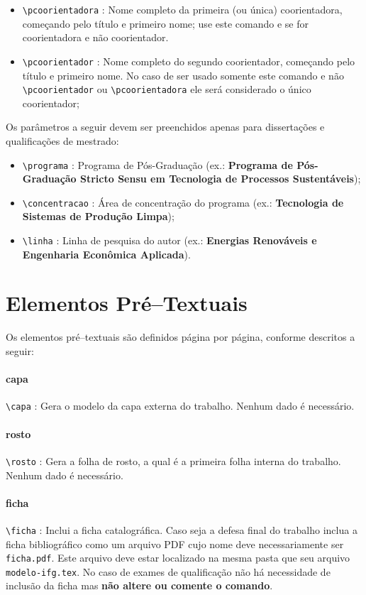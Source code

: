 \begin{itemize}
\item \verb|\pcoorientadora| : Nome completo da primeira (ou única) coorientadora, começando pelo título e primeiro nome; use este comando e se for coorientadora e não coorientador.
\item \verb|\pcoorientador| : Nome completo do segundo coorientador, começando pelo título e primeiro nome. No caso de ser usado somente este comando e não \verb|\pcoorientador| ou \verb|\pcoorientadora| ele será considerado o único coorientador;
\end{itemize}

Os parâmetros a seguir devem ser preenchidos apenas para dissertações e  qualificações de mestrado:

 \begin{itemize}
\item \verb|\programa| : Programa de Pós-Graduação (ex.: \textbf{Programa de Pós-Graduação Stricto Sensu em Tecnologia de Processos Sustentáveis});
\item \verb|\concentracao| : Área de concentração do programa (ex.: \textbf{Tecnologia de Sistemas de Produção Limpa});
\item \verb|\linha| : Linha de pesquisa do autor (ex.: \textbf{Energias Renováveis e Engenharia Econômica Aplicada}).
\end{itemize}

\section{Elementos Pré--Textuais}
\label{sec:pre}
Os elementos pré--textuais são definidos página por página, conforme descritos a seguir:

\paragraph{capa\\}
\verb|\capa| : Gera o modelo da capa externa do trabalho. Nenhum dado é necessário.

\paragraph{rosto\\}
\verb|\rosto| : Gera a folha de rosto, a qual é a primeira folha interna do trabalho. Nenhum dado é necessário.

\paragraph{ficha\\}
\verb|\ficha| : Inclui a ficha catalográfica. Caso seja a defesa final do trabalho inclua a ficha bibliográfico como um arquivo PDF cujo nome deve necessariamente ser \verb|ficha.pdf|. Este arquivo deve estar localizado na mesma pasta que seu arquivo \verb|modelo-ifg.tex|. No caso de exames de qualificação não há necessidade de inclusão da ficha mas \textbf{não altere ou comente o comando}.

